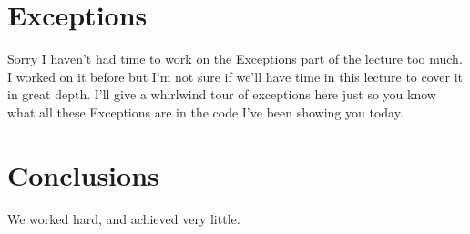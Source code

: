 \documentclass[12pt]{article}
\begin{document}
\section{Exceptions}

Sorry I haven't had time to work on the Exceptions part of the lecture too much. I worked on it before but I'm not sure if we'll have time in this lecture to cover it in great depth. I'll give a whirlwind tour of exceptions here just so you know what all these Exceptions are in the code I've been showing you today.

\section{Conclusions}\label{conclusions}
We worked hard, and achieved very little.
\end{document}
